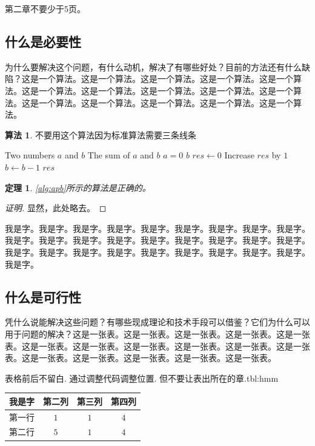 \documentclass[supercite]{HustGraduPaper}
\newcommand{\ralg}[1]{\autoref{alg:#1}}
\newtheorem{thm}{定理}[section]
\theoremstyle{definition}
\newtheorem{alg}{算法}[section]
\begin{document}
第二章不要少于5页。

\subsection{什么是必要性}

为什么要解决这个问题，有什么动机，解决了有哪些好处\cite{LTE2015MIP}？目前的方法还有什么缺陷？这是一个算法。这是一个算法。这是一个算法。这是一个算法。这是一个算法。这是一个算法。这是一个算法。这是一个算法。这是一个算法。这是一个算法。这是一个算法。这是一个算法。这是一个算法。这是一个算法。这是一个算法。

\begin{shaded*}\begin{alg}{不要用这个算法因为标准算法需要三条线条}
  \label{alg:apb}
  \begin{algorithmic}
    \Input Two numbers $a$ and $b$
    \Output The sum of $a$ and $b$
      \If $a = 0$
        \State \Return $b$
      \EndIf
      \State $res \gets 0$
        \State Increase $res$ by $1$
        \State $b \gets b - 1$
      \EndWhile
      \State \Return $res$
    \EndProcedure
  \end{algorithmic}
\end{alg}\end{shaded*}

\begin{thm} \label{thm:gsb-apprx}
  \ralg{apb}所示的算法是正确的。
\end{thm}
\begin{proof}[证明]
  显然，此处略去。
\end{proof}

我是字。我是字。我是字。我是字。我是字。我是字。我是字。我是字。我是字。我是字。我是字。我是字。我是字。我是字。我是字。我是字。我是字。我是字。我是字。我是字。我是字。我是字。我是字。我是字。我是字。我是字。我是字。我是字。

\subsection{什么是可行性}

凭什么说能解决这些问题\cite{MIH2010IEEE}？有哪些现成理论和技术手段可以借鉴？它们为什么可以用于问题的解决？这是一张表。这是一张表。这是一张表。这是一张表。这是一张表。这是一张表。这是一张表。这是一张表。这是一张表。这是一张表。这是一张表。这是一张表。这是一张表。这是一张表。这是一张表。这是一张表。

\begin{generaltab}{表格前后不留白. 通过调整代码调整位置. 但不要让表出所在的章.}{tbl:hmm}
  \begin{tabular}{c|ccc}
    \toprule
    我是字 & 第二列 & 第三列 & 第四列 \\
    \midrule
    第一行 & $1$ & $1$ & $4$ \\
    第二行 & $5$ & $1$ & $4$ \\
    \bottomrule
  \end{tabular}
\end{generaltab}
\end{document}
